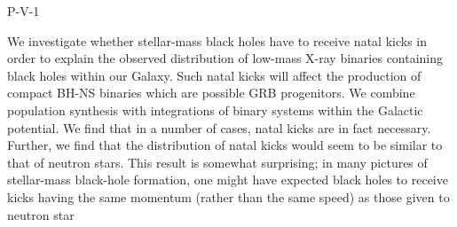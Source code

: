 P-V-1


\bigskip



\bigskip

\noindent We investigate whether stellar-mass black holes have to receive natal kicks in order to explain the observed distribution of low-mass X-ray binaries containing black holes within our Galaxy. Such natal kicks will affect the production of compact BH-NS binaries which are possible GRB progenitors.
We combine population synthesis  with integrations of binary systems within the Galactic potential. We find that in a number of cases, natal kicks are in fact necessary. Further, we find that the distribution of natal kicks would seem to be similar to that of neutron stars. This result is somewhat surprising; in many pictures of stellar-mass black-hole formation, one might have expected black holes to receive kicks having the same momentum (rather than the same speed) as those given to neutron star
